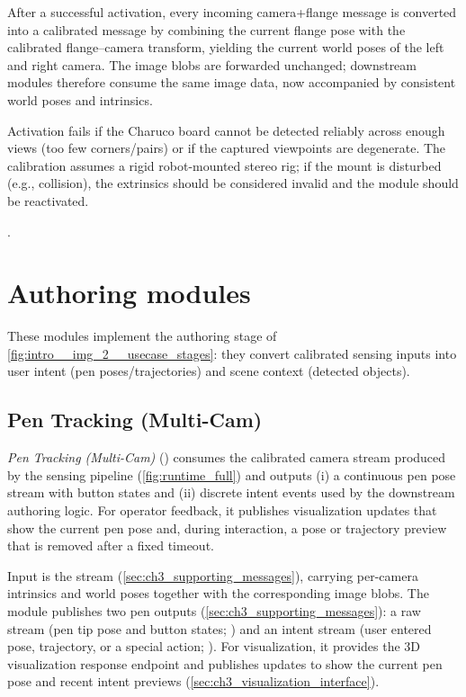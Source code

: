 After a successful activation, every incoming camera+flange message is converted into a calibrated message by combining the current flange pose with the calibrated flange--camera transform, yielding the current world poses of the left and right camera. The image blobs are forwarded unchanged; downstream modules therefore consume the same image data, now accompanied by consistent world poses and intrinsics.

Activation fails if the Charuco board cannot be detected reliably across enough views (too few corners/pairs) or if the captured viewpoints are degenerate. The calibration assumes a rigid robot-mounted stereo rig; if the mount is disturbed (e.g., collision), the extrinsics should be considered invalid and the module should be reactivated.

.

\section{Authoring modules}
\label{sec:ch4_authoring_modules}

These modules implement the authoring stage of \autoref{fig:intro__img_2__usecase_stages}:
they convert calibrated sensing inputs into user intent (pen poses/trajectories) and scene context (detected objects).

\subsection{Pen Tracking (Multi-Cam)}
\label{subsec:ch4_mod_pen_tracking}

\emph{Pen Tracking (Multi-Cam)} () consumes the calibrated camera stream produced by the sensing pipeline (\autoref{fig:runtime_full}) and outputs
(i) a continuous pen pose stream with button states and (ii) discrete intent events used by the downstream authoring logic.
For operator feedback, it publishes visualization updates that show the current pen pose and, during interaction, a pose or trajectory preview that is removed after a fixed timeout.

Input is the  stream (\autoref{sec:ch3_supporting_messages}), carrying per-camera intrinsics and world poses together with the corresponding image blobs.
The module publishes two pen outputs (\autoref{sec:ch3_supporting_messages}): a raw stream (pen tip pose and button states; ) and an intent stream (user entered pose, trajectory, or a special action; ).
For visualization, it provides the 3D visualization response endpoint and publishes updates to show the current pen pose and recent intent previews (\autoref{sec:ch3_visualization_interface}).

